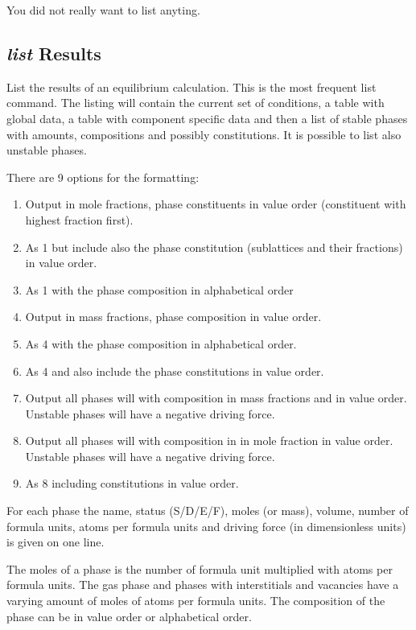 \documentclass[12pt]{article}
\begin{document}
You did not really want to list anyting.

\subsection{{\em list} Results}

List the results of an equilibrium calculation.  This is the most
frequent list command.  The listing will contain the current set of
conditions, a table with global data, a table with component specific
data and then a list of stable phases with amounts, compositions and
possibly constitutions.  It is possible to list also unstable phases.

There are 9 options for the formatting:
\begin{enumerate}
\item Output in mole fractions, phase constituents in value order
  (constituent with highest fraction first).
\item As 1 but include also the phase constitution (sublattices and
  their fractions) in value order.
\item As 1 with the phase composition in alphabetical order
\item Output in mass fractions, phase composition in value order.
\item As 4 with the phase composition in alphabetical order.
\item As 4 and also include the phase constitutions in value order.
\item Output all phases will with composition in mass fractions and
  in value order.  Unstable phases will have a negative driving force.
\item Output all phases will with composition in in mole fraction in 
  value order.  Unstable phases will have a negative driving force.
\item As 8 including constitutions in value order.
\end{enumerate}

For each phase the name, status (S/D/E/F), moles (or mass), volume,
number of formula units, atoms per formula units and driving force (in
dimensionless units) is given on one line.

The moles of a phase is the number of formula unit multiplied with
atoms per formula units.  The gas phase and phases with interstitials
and vacancies have a varying amount of moles of atoms per formula
units.  The composition of the phase can be in value order or
alphabetical order.
\end{document}
